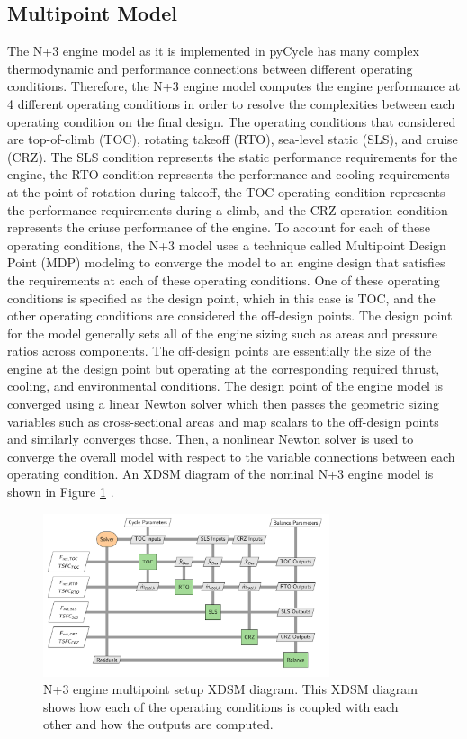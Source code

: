 \documentclass[conf]{new-aiaa}
\begin{document}
\subsection{Multipoint Model}
The N+3 engine model as it is implemented in pyCycle has many complex thermodynamic and performance connections between different operating conditions.
Therefore, the N+3 engine model computes the engine performance at 4 different operating conditions in order to resolve the complexities between each operating condition on the final design.
The operating conditions that considered are top-of-climb (TOC), rotating takeoff (RTO), sea-level static (SLS), and cruise (CRZ).
The SLS condition represents the static performance requirements for the engine, the RTO condition represents the performance and cooling requirements at the point of rotation during takeoff, the TOC operating condition represents the performance requirements during a climb, and the CRZ operation condition represents the criuse performance of the engine.
To account for each of these operating conditions, the N+3 model uses a technique called Multipoint Design Point (MDP) modeling to converge the model to an engine design that satisfies the requirements at each of these operating conditions.
One of these operating conditions is specified as the design point, which in this case is TOC, and the other operating conditions are considered the off-design points.
The design point for the model generally sets all of the engine sizing such as areas and pressure ratios across components.
The off-design points are essentially the size of the engine at the design point but operating at the corresponding required thrust, cooling, and environmental conditions.
The design point of the engine model is converged using a linear Newton solver which then passes the geometric sizing variables such as cross-sectional areas and map scalars to the off-design points and similarly converges those.
Then, a nonlinear Newton solver is used to converge the overall model with respect to the variable connections between each operating condition.
An XDSM diagram of the nominal N+3 engine model is shown in Figure \ref{fig:N3_xdsm} \cite{Hendricks2019}.

\begin{figure}[hbt!]
  \centering
  \includegraphics[width=0.75\textwidth]{N3_xdsm.pdf}
  \caption{
    N+3 engine multipoint setup XDSM diagram.
    This XDSM diagram shows how each of the operating conditions is coupled with each other and how the outputs are computed.
  }
  \label{fig:N3_xdsm}
\end{figure}
\end{document}
